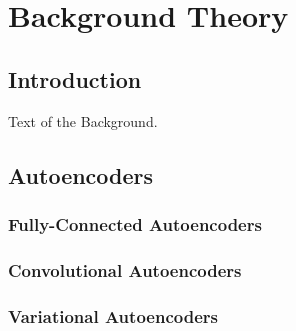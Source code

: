 \chapter{Background Theory}

\label{ch:background}

\section{Introduction}

Text of the Background.

\section{Autoencoders}



\subsection{Fully-Connected Autoencoders}

\subsection{Convolutional Autoencoders}

\subsection{Variational Autoencoders}